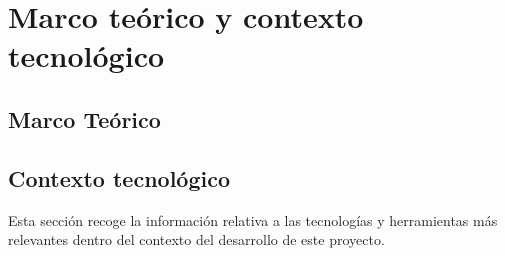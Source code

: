 \chapter{Marco teórico y contexto tecnológico}
\label{chapter:marco}


\section{Marco Teórico}


%
%
%
%


\section{Contexto tecnológico}

Esta sección recoge la información relativa a las tecnologías y herramientas más relevantes dentro del contexto del desarrollo de este proyecto.

